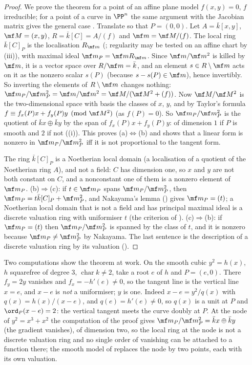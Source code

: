 \begin{proof}
We prove the theorem for a point of an affine plane model $f(x,y)=0$, $f$ irreducible; for a point of a curve in $\PP^n$ the same argument with the
Jacobian matrix gives the general case \cite[Chapter II, Proposition 1.1]{SilvermanAEC}. Translate so that $P=(0,0)$. Let $A=\bar k[x,y]$,
$\mf M=(x,y)$, $R=\bar k[C]=A/(f)$ and $\mf m=\mf M/(f)$. The local ring $\bar k[C]_P$ is the localisation $R_{\mf m}$ (; regularity may be tested on an affine chart by
(iii)), with maximal ideal
$\mf m_P=\mf mR_{\mf m}$. Since $\mf m/\mf m^2$ is killed by $\mf m$, it is a vector space over $R/\mf m=\bar k$, and an element $s\in R\setminus\mf m$ acts on it as
the nonzero scalar $s(P)$ (because $s-s(P)\in\mf m$), hence invertibly. So inverting the elements of $R\setminus\mf m$ changes nothing:
$\mf m_P/\mf m_P^2=\mf m/\mf m^2=\mf M/(\mf M^2+(f))$.
Now $\mf M/\mf M^2$ is the two-dimensional space with basis the classes of $x$, $y$, and by Taylor's formula $f\equiv f_x(P)x+f_y(P)y\pmod{\mf M^2}$ (as
$f(P)=0$). So $\mf m_P/\mf m_P^2$ is the quotient of $\bar kx\oplus\bar ky$ by the span of $f_x(P)x+f_y(P)y$: of dimension $1$ if $P$ is smooth and $2$ if not
((i)). This proves (a)$\Leftrightarrow$(b) and shows that a linear form is nonzero in $\mf m_P/\mf m_P^2$ iff it is not proportional to the
tangent form.

The ring $\bar k[C]_P$ is a Noetherian local domain (a localisation of a quotient of the Noetherian ring $A$), and not a field: $C$ has dimension one,
so $x$ and $y$ are not both constant on $C$, and a nonconstant one of them is a nonzero element of $\mf m_P$. (b)$\Rightarrow$(c): if $t\in\mf m_P$ spans
$\mf m_P/\mf m_P^2$, then $\mf m_P=t\bar k[C]_P+\mf m_P^2$, and Nakayama's lemma () gives $\mf m_P=(t)$; a Noetherian local domain that is not a
field and has principal maximal ideal is a discrete valuation ring with uniformiser $t$ (the criterion of ). (c)$\Rightarrow$(b): if
$\mf m_P=(t)$ then $\mf m_P/\mf m_P^2$ is spanned by the class of $t$, and it is nonzero because $\mf m_P\ne\mf m_P^2$ by Nakayama. The last sentence is the
description of a discrete valuation ring by its valuation ().
\end{proof}

Two computations show the theorem at work. On the smooth cubic $y^2=h(x)$, $h$ squarefree of degree $3$, $\operatorname{char}k\ne2$, take a root $e$ of $h$ and
$P=(e,0)$. There $f_y=2y$ vanishes and $f_x=-h'(e)\ne0$, so the tangent line is the vertical line $x=e$, and $x-e$ is \emph{not} a uniformiser; $y$ is one.
Indeed $x-e=y^2/q(x)$ with $q(x)=h(x)/(x-e)$, and $q(e)=h'(e)\ne0$, so $q(x)$ is a unit at $P$ and $\ord_P(x-e)=2$: the vertical tangent meets the curve
doubly at $P$. At the node of $y^2=x^3+x^2$ the computation of the proof gives $\mf m_P/\mf m_P^2=\bar kx\oplus\bar ky$ (the gradient vanishes), of dimension two,
so the local ring at the node is not a discrete valuation ring and no single order of vanishing can be attached to a function there; the smooth model of
 replaces the node by two points, each with its own valuation.

